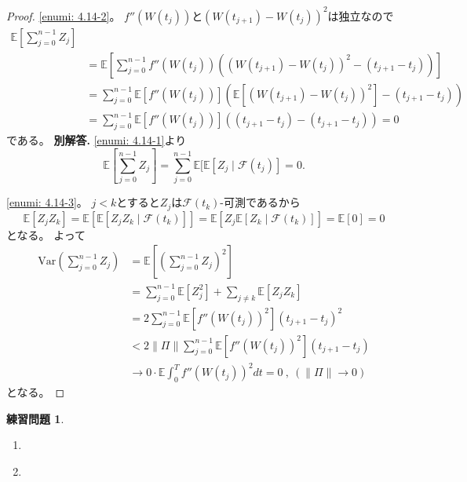 \documentclass[uplatex]{jsarticle}
\theoremstyle{definition}
\newtheorem{prob}[prob]{練習問題}
\def\E{\mathbb{E}}
\def\mcF{\mathcal{F}}
\newcommand{\Var}{\mathrm{Var}}
\begin{document}
\begin{proof}
  \ref{enumi: 4.14-2}。
  \(f''(W(t_j))\)と\((W(t_{j+1})-W(t_j))^2\)は独立なので
  \begin{align*}
    \E [\sum_{j=0}^{n-1}Z_j] \\
    &= \E \left[ \sum_{j=0}^{n-1} f''(W(t_j))
    \left( (W(t_{j+1})-W(t_j))^2 - (t_{j+1}-t_j)\right) \right] \\
    &= \sum_{j=0}^{n-1} \E [f''(W(t_j))] \left(
    \E [(W(t_{j+1})-W(t_j))^2] - (t_{j+1}-t_j)\right)  \\
    &= \sum_{j=0}^{n-1} \E [f''(W(t_j))] \left(
    (t_{j+1}-t_j) - (t_{j+1}-t_j)\right) = 0
  \end{align*}
  である。
  \textbf{別解答.}
  \ref{enumi: 4.14-1}より
  \[
  \E [\sum_{j=0}^{n-1}Z_j]
  = \sum_{j=0}^{n-1}\E [\E[Z_j\mid \mcF(t_j)] = 0.
  \]

  \ref{enumi: 4.14-3}。
  \(j < k\)とすると\(Z_j\)は\(\mcF(t_k)\)-可測であるから
  \[
  \E[Z_jZ_k] = \E[\E[Z_jZ_k\mid \mcF(t_k)]]
  = \E[Z_j\E[Z_k\mid \mcF(t_k)]] = \E[0] = 0
  \]
  となる。
  よって
  \begin{align*}
    \Var(\sum_{j=0}^{n-1}Z_j)
    &= \E \left[ \left( \sum_{j=0}^{n-1}Z_j\right)^2 \right] \\
    &= \sum_{j=0}^{n-1} \E [ Z_j^2 ]
    + \sum_{j\neq k}\E [Z_jZ_k] \\
    &= 2\sum_{j=0}^{n-1} \E [ f''(W(t_j))^2 ] (t_{j+1}-t_j)^2 \\
    &< 2 \|\Pi\| \sum_{j=0}^{n-1} \E [ f''(W(t_j))^2 ] (t_{j+1}-t_j) \\
    &\to 0\cdot \E \int_0^T f''(W(t_j))^2 dt = 0 \ , \ (\|\Pi\| \to 0)
  \end{align*}
  となる。
\end{proof}



\begin{prob}\label{prob: 4.15}
  \begin{enumerate}
    \item \label{enumi: 4.15-1}
    \item \label{enumi: 4.15-2}
  \end{enumerate}
\end{prob}
\end{document}

